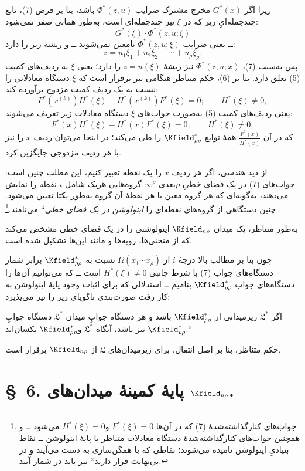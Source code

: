 \documentclass[11pt]{article}
\providecommand{\glqq}{\textquotedblbase}
\providecommand{\grqq}{\textquotedblleft}
\newcommand{\srcLTR}[1]{\relax\ifmmode\text{\mbox{\babelsublr{\foreignlanguage{english}{#1}}}}\else\babelsublr{\foreignlanguage{english}{#1}}\fi}
\newcommand{\srcfn}[2]{\begingroup\renewcommand{\thefootnote}{\srcLTR{#1}}\footnote{#2}\addtocounter{footnote}{-1}\endgroup}
\providecommand{\Lsys}{\mathfrak{L}}
\begin{document}
زیرا اگر $G^*(x)$ مخرج مشترک ضرایب $\Phi^*(z,u)$ باشد، بنا بر فرض (7)، تابع چندجمله‌ایِ زیر که در $\xi$ نیز چندجمله‌ای است، به‌طور همانی صفر نمی‌شود:
\[
G^*(\xi)\cdot\Phi^*(z,u;\xi)
\]
ــ یعنی ضرایب $\Phi^*(z,u;\xi)$ نامعین نمی‌شوند ــ و ریشهٔ زیر را دارد:
\[
z=u_1\xi_1+u_2\xi_2+\cdots+u_\rho\xi_\rho.
\]
پس به‌سبب (7)، $\Phi^*(z,u;x)$ نیز ریشهٔ $z=u(\xi)$ را دارد؛ یعنی $\xi$ به ردیف‌های کمیت (5) تعلق دارد. بنا بر (6)، حکم متناظر هنگامی نیز برقرار است که $\xi$ دستگاه معادلاتی را نسبت به یک ردیف کمیت مزدوج برآورده کند:
\[
F^*(x^{(k)})H^*(\xi)-H^*(x^{(k)})F^*(\xi)=0;\qquad H^*(\xi)\ne0,
\]
یعنی ردیف‌های کمیت (5) به‌صورت جواب‌های $\xi$ دستگاه معادلات زیر تعریف می‌شوند:
\[
F^*(x)H^*(\xi)-H^*(x)F^*(\xi)=0;\qquad H^*(\xi)\ne0,
\]
که در آن $\frac{F^*(x)}{H^*(x)}$ همهٔ توابع $\Kfield^*_{\rho\rho}$ را طی می‌کند؛ در اینجا می‌توان ردیف $x$ را نیز با هر ردیف مزدوجی جایگزین کرد.

از دید هندسی، اگر هر ردیف $x$ را یک نقطه تعبیر کنیم، این مطلب چنین است: جواب‌های (7) در یک فضای خطیِ $\rho$بعدی $\infty^\rho$ گروه‌هایی هریک شامل $i$ نقطه را نمایش می‌دهند، به‌گونه‌ای که هر گروه معین با هر نقطهٔ آن گروه به‌طور یکتا تعیین می‌شود. چنین دستگاهی از گروه‌های نقطه‌ای را \glqq{}\emph{اینولوشن در یک فضای خطی}\grqq{} می‌نامند.\srcfn{*)}{جواب‌های کنارگذاشته‌شدهٔ (7) که در آن‌ها $F^*(\xi)=0$ و$H^*(\xi)=0$ می‌شود ــ و همچنین جواب‌های کنارگذاشته‌شدهٔ دستگاه معادلات متناظر با پایهٔ اینولوشن ــ نقاط بنیادیِ اینولوشن نامیده می‌شوند؛ نقاطی که با همگن‌سازی به دست می‌آیند و \glqq{}در بی‌نهایت قرار دارند\grqq{} نیز باید در شمار آیند.}

به‌طور متناظر، یک میدان $\Kfield_{n\rho}$ اینولوشنی را در یک فضای خطی مشخص می‌کند که از منحنی‌ها، رویه‌ها و مانند این‌ها تشکیل شده است.

چون بنا بر مطالب بالا درجهٔ $i$ از $\Omega(x_1\cdots x_\rho)$ نسبت به $\Kfield^*_{\rho\rho}$ برابر شمار دستگاه‌های جواب (7) با شرط جانبی $H^*(\xi)\ne0$ است ــ که می‌توانیم آن‌ها را دستگاه‌های جواب $\Kfield^*_{\rho\rho}$ بنامیم ــ استدلالی که برای اثبات وجود پایهٔ اینولوشن به کار رفت صورت‌بندی ناگویای زیر را نیز می‌پذیرد:

\glqq{}اگر $\Lsys^*$ زیرمیدانی از $\Kfield^*_{\rho\rho}$ باشد و هر دستگاه جوابِ میدان $\Lsys^*$ دستگاه جوابِ $\Kfield^*_{\rho\rho}$ نیز باشد، آنگاه $\Lsys^*$ و$\Kfield^*_{\rho\rho}$ یکسان‌اند.\grqq{}

حکم متناظر، بنا بر اصل انتقال، برای زیرمیدان‌های $\Lsys$ از $\Kfield_{n\rho}$ برقرار است.

\section*{\S\ 6. پایهٔ کمینهٔ میدان‌های $\Kfield_{n\rho}$.}
\end{document}
